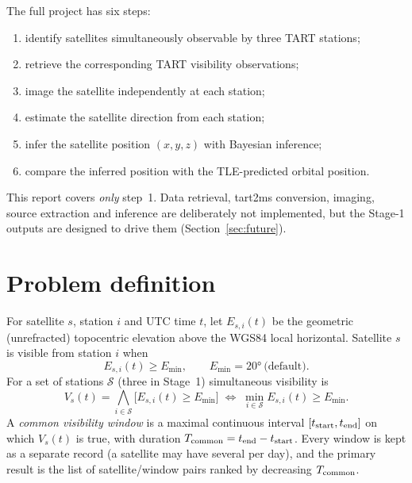 \documentclass[11pt,a4paper]{article}
\newcommand{\code}[1]{{\ttfamily\def\_{\textunderscore\allowbreak}#1}}
\begin{document}
The full project has six steps:
\begin{enumerate}
\item identify satellites simultaneously observable by three TART stations;
\item retrieve the corresponding TART visibility observations;
\item image the satellite independently at each station;
\item estimate the satellite direction from each station;
\item infer the satellite position $(x,y,z)$ with Bayesian inference;
\item compare the inferred position with the TLE-predicted orbital position.
\end{enumerate}
This report covers \emph{only} step~1. Data retrieval, \code{tart2ms}
conversion, imaging, source extraction and inference are deliberately not
implemented, but the Stage-1 outputs are designed to drive them
(Section~\ref{sec:future}).

\section{Problem definition}

For satellite $s$, station $i$ and UTC time $t$, let $E_{s,i}(t)$ be the
geometric (unrefracted) topocentric elevation above the WGS84 local
horizontal. Satellite $s$ is visible from station $i$ when
\begin{equation}
E_{s,i}(t) \ge E_{\min}, \qquad E_{\min} = \ang{20}\ \text{(default)}.
\end{equation}
For a set of stations $\mathcal{S}$ (three in Stage~1) simultaneous
visibility is
\begin{equation}
V_s(t) = \bigwedge_{i\in\mathcal{S}} \bigl[E_{s,i}(t)\ge E_{\min}\bigr]
\;\Longleftrightarrow\; \min_{i\in\mathcal{S}} E_{s,i}(t) \ge E_{\min}.
\label{eq:common}
\end{equation}
A \emph{common visibility window} is a maximal continuous interval
$[t_{\rm start},t_{\rm end}]$ on which $V_s(t)$ is true, with duration
$T_{\rm common}=t_{\rm end}-t_{\rm start}$. Every window is kept as a separate
record (a satellite may have several per day), and the primary result is the
list of satellite/window pairs ranked by decreasing $T_{\rm common}$.

\end{document}
